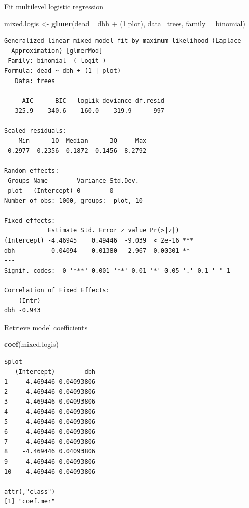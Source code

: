 \documentclass[10pt,ignorenonframetext,]{beamer}
\newenvironment{Shaded}{\begin{snugshade}}{\end{snugshade}}
\newcommand{\KeywordTok}[1]{\textcolor[rgb]{0.13,0.29,0.53}{\textbf{{#1}}}}
\newcommand{\DataTypeTok}[1]{\textcolor[rgb]{0.13,0.29,0.53}{{#1}}}
\newcommand{\DecValTok}[1]{\textcolor[rgb]{0.00,0.00,0.81}{{#1}}}
\newcommand{\StringTok}[1]{\textcolor[rgb]{0.31,0.60,0.02}{{#1}}}
\newcommand{\NormalTok}[1]{{#1}}
\begin{document}
\begin{frame}[fragile]{Fit multilevel logistic regression}

\begin{Shaded}
\begin{Highlighting}[]
\NormalTok{mixed.logis <-}\StringTok{ }\KeywordTok{glmer}\NormalTok{(dead ~}\StringTok{ }\NormalTok{dbh +}\StringTok{ }\NormalTok{(}\DecValTok{1}\NormalTok{|plot), }\DataTypeTok{data=}\NormalTok{trees, }\DataTypeTok{family =} \NormalTok{binomial)}
\end{Highlighting}
\end{Shaded}

\begin{verbatim}
Generalized linear mixed model fit by maximum likelihood (Laplace
  Approximation) [glmerMod]
 Family: binomial  ( logit )
Formula: dead ~ dbh + (1 | plot)
   Data: trees

     AIC      BIC   logLik deviance df.resid 
   325.9    340.6   -160.0    319.9      997 

Scaled residuals: 
    Min      1Q  Median      3Q     Max 
-0.2977 -0.2356 -0.1872 -0.1456  8.2792 

Random effects:
 Groups Name        Variance Std.Dev.
 plot   (Intercept) 0        0       
Number of obs: 1000, groups:  plot, 10

Fixed effects:
            Estimate Std. Error z value Pr(>|z|)    
(Intercept) -4.46945    0.49446  -9.039  < 2e-16 ***
dbh          0.04094    0.01380   2.967  0.00301 ** 
---
Signif. codes:  0 '***' 0.001 '**' 0.01 '*' 0.05 '.' 0.1 ' ' 1

Correlation of Fixed Effects:
    (Intr)
dbh -0.943
\end{verbatim}

\end{frame}

\begin{frame}[fragile]{Retrieve model coefficients}

\begin{Shaded}
\begin{Highlighting}[]
\KeywordTok{coef}\NormalTok{(mixed.logis)}
\end{Highlighting}
\end{Shaded}

\begin{verbatim}
$plot
   (Intercept)        dbh
1    -4.469446 0.04093806
2    -4.469446 0.04093806
3    -4.469446 0.04093806
4    -4.469446 0.04093806
5    -4.469446 0.04093806
6    -4.469446 0.04093806
7    -4.469446 0.04093806
8    -4.469446 0.04093806
9    -4.469446 0.04093806
10   -4.469446 0.04093806

attr(,"class")
[1] "coef.mer"
\end{verbatim}

\end{frame}
\end{document}
